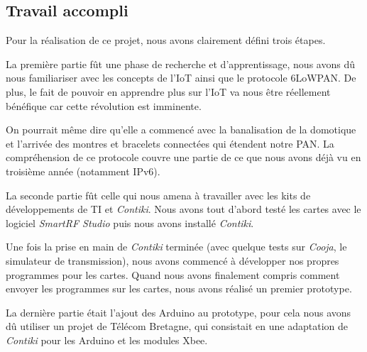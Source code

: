 
\subsection{Travail accompli}

\noindent Pour la réalisation de ce projet, nous avons clairement défini trois étapes.

La première partie fût une phase de recherche et d'apprentissage, nous avons dû nous fami\-liariser avec les concepts de l'IoT ainsi que le protocole 6LoWPAN.
De plus, le fait de pouvoir en apprendre plus sur l'IoT va nous être réellement bénéfique car cette révolution est imminente.

On pourrait même dire qu’elle a commencé avec la banalisation de la domotique et l'arrivée des montres et bracelets connectées qui étendent notre PAN.
La compréhension de ce protocole couvre une partie de ce que nous avons déjà vu en troisième année (notamment IPv6).

La seconde partie fût celle qui nous amena à travailler avec les kits de développements de TI et \textit{Contiki}. Nous avons tout d'abord testé les cartes avec le logiciel \textit{SmartRF Studio} puis nous avons installé \textit{Contiki}.

Une fois la prise en main de \textit{Contiki} terminée (avec quelque tests sur \textit{Cooja}, le simulateur de transmission), nous avons commencé à développer nos propres programmes pour les cartes. Quand nous avons finalement compris comment envoyer les programmes sur les cartes, nous avons réalisé un premier prototype.

La dernière partie était l'ajout des Arduino au prototype, pour cela nous avons dû utiliser un projet de Télécom Bretagne, qui consistait en une adaptation de \textit{Contiki} pour les Arduino et les modules Xbee.
